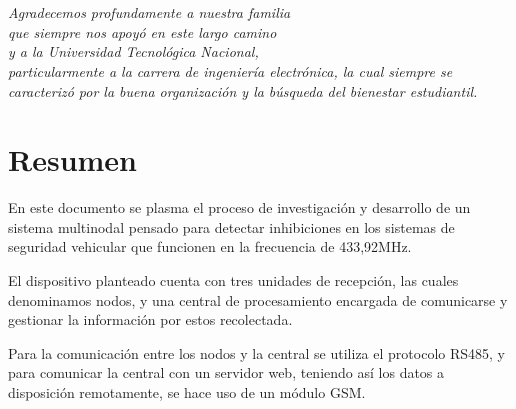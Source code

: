 \documentclass[12pt]{report}
\begin{document}

\chapter*{}
\begin{flushright}
\textit{Agradecemos profundamente a nuestra familia \\
que siempre nos apoyó en este largo camino \\
y a la Universidad Tecnológica Nacional, \\
particularmente a la carrera de ingeniería electrónica,
la cual siempre se caracterizó por la buena organización y la búsqueda del bienestar estudiantil.}
\end{flushright}

\chapter*{Resumen} %

En este documento se plasma el proceso de investigación y desarrollo de un sistema multinodal pensado para detectar 
inhibiciones en los sistemas de seguridad vehicular que funcionen en la frecuencia de 433,92MHz.\par
El dispositivo planteado cuenta con tres unidades de recepción, las cuales denominamos nodos, y una central de procesamiento
encargada de comunicarse y gestionar la información por estos recolectada. \par
Para la comunicación entre los nodos y la central se utiliza el protocolo RS485, 
y para comunicar la central con un servidor web, teniendo así los datos a disposición remotamente, se hace uso de un módulo GSM.


\tableofcontents %

\cleardoublepage
\listoffigures %

\cleardoublepage
\listoftables %

\end{document}
